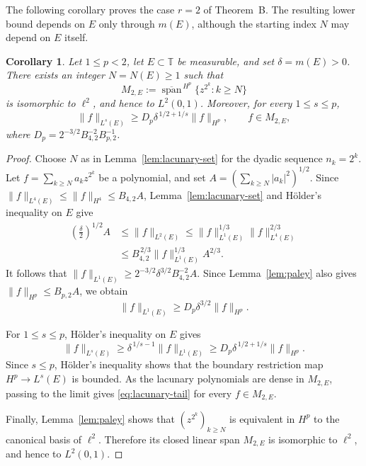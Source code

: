 \documentclass[10pt,a4paper]{amsart}
\newtheorem{corollary}[theorem]{Corollary}
\newcommand{\T}{\mathbb{T}}
\begin{document}
The following corollary proves the case \(r=2\) of Theorem~B. The
resulting lower bound depends on \(E\) only through \(m(E)\), although
the starting index \(N\) may depend on \(E\) itself.

\begin{corollary}
\label{cor:lacunary-tail}
Let \(1\le p<2\), let \(E\subset\T\) be measurable, and set
\(\delta=m(E)>0\). There exists an integer \(N=N(E)\ge1\) such that
\[
        M_{2,E}
        :=
        \overline{\operatorname{span}}^{\,H^p}
        \{z^{2^k}:k\ge N\}
\]
is isomorphic to \(\ell^2\), and hence to \(L^2(0,1)\). Moreover,
for every \(1\le s\le p\),
\begin{equation}
\label{eq:lacunary-tail}
        \|f\|_{L^s(E)}
        \ge
        D_p\delta^{\,1/2+1/s}\|f\|_{H^p},
        \qquad
        f\in M_{2,E},
\end{equation}
where
\(D_p=2^{-3/2}B_{4,2}^{-2}B_{p,2}^{-1}\).
\end{corollary}

\begin{proof}
Choose \(N\) as in Lemma~\ref{lem:lacunary-set} for the
dyadic sequence \(n_k=2^k\). Let
\(f=\sum\limits_{k\ge N}a_kz^{2^k}\) be a polynomial, and set
\(A=(\sum\limits_{k\ge N}|a_k|^2)^{1/2}\). Since
\(\|f\|_{L^4(E)}\le\|f\|_{H^4}\le B_{4,2}A\),
Lemma~\ref{lem:lacunary-set} and H\"older's inequality on \(E\)
give
\[
\begin{aligned}
        \left(\frac{\delta}{2}\right)^{1/2}A
        &\le
        \|f\|_{L^2(E)}
        \le
        \|f\|_{L^1(E)}^{1/3}\|f\|_{L^4(E)}^{2/3} \\
        &\le
        B_{4,2}^{\,2/3}\|f\|_{L^1(E)}^{1/3}A^{2/3}.
\end{aligned}
\]
It follows that
\(\|f\|_{L^1(E)}
\ge2^{-3/2}\delta^{3/2}B_{4,2}^{-2}A\).
Since Lemma~\ref{lem:paley} also gives
\(\|f\|_{H^p}\le B_{p,2}A\), we obtain
\[
        \|f\|_{L^1(E)}
        \ge
        D_p\delta^{3/2}\|f\|_{H^p}.
\]

For \(1\le s\le p\), H\"older's inequality on \(E\) gives
\[
        \|f\|_{L^s(E)}
        \ge
        \delta^{\,1/s-1}\|f\|_{L^1(E)}
        \ge
        D_p\delta^{\,1/2+1/s}\|f\|_{H^p}.
\]
Since \(s\le p\), H\"older's inequality shows that the boundary
restriction map \(H^p\to L^s(E)\) is bounded. As the lacunary
polynomials are dense in \(M_{2,E}\), passing to the limit gives
\eqref{eq:lacunary-tail} for every \(f\in M_{2,E}\).

Finally, Lemma~\ref{lem:paley} shows that
\((z^{2^k})_{k\ge N}\) is equivalent in \(H^p\) to the canonical basis
of \(\ell^2\). Therefore its closed linear span \(M_{2,E}\) is
isomorphic to \(\ell^2\), and hence to \(L^2(0,1)\).
\end{proof}
\end{document}
